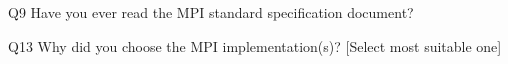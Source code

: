 \begin{description}%
\item{Q9} Have you ever read the MPI standard specification document?%
\item{Q13} Why did you choose the MPI implementation(s)? [Select most suitable one]%
\end{description}%
